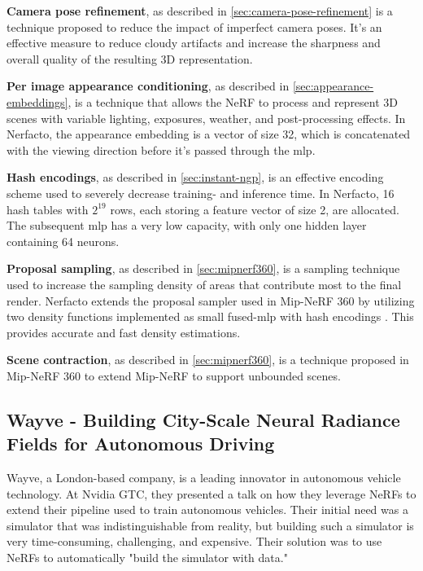 

\textbf{Camera pose refinement}, as described in \autoref{sec:camera-pose-refinement} is a technique proposed to reduce the impact of imperfect camera poses. It's an effective measure to reduce cloudy artifacts and increase the sharpness and overall quality of the resulting 3D representation.

\textbf{Per image appearance conditioning}, as described in \autoref{sec:appearance-embeddings}, is a technique that allows the NeRF to process and represent 3D scenes with variable lighting, exposures, weather, and post-processing effects. In Nerfacto, the appearance embedding is a vector of size 32, which is concatenated with the viewing direction before it's passed through the \acrshort{mlp}.

\textbf{Hash encodings}, as described in \autoref{sec:instant-ngp}, is an effective encoding scheme used to severely decrease training- and inference time. In Nerfacto, 16 hash tables with $2^{19}$ rows, each storing a feature vector of size 2, are allocated. The subsequent \acrshort{mlp} has a very low capacity, with only one hidden layer containing 64 neurons.

\textbf{Proposal sampling}, as described in \autoref{sec:mipnerf360}, is a sampling technique used to increase the sampling density of areas that contribute most to the final render. Nerfacto extends the proposal sampler used in Mip-NeRF 360 \cite{barron_mip-nerf_2022} by utilizing two density functions implemented as small fused-\acrshort{mlp} with hash encodings \cite{muller_instant_2022}. This provides accurate and fast density estimations.

\textbf{Scene contraction}, as described in \autoref{sec:mipnerf360}, is a technique proposed in Mip-NeRF 360 \cite{barron_mip-nerf_2022} to extend Mip-NeRF to support unbounded scenes.




\subsection[Wayve - NeRFs for Autonomous Driving]{Wayve - Building City-Scale Neural Radiance Fields for Autonomous Driving} \label{sec:wayve}
Wayve, a London-based company, is a leading innovator in autonomous vehicle technology. At Nvidia GTC, they presented a talk on how they leverage NeRFs to extend their pipeline used to train autonomous vehicles. Their initial need was a simulator that was indistinguishable from reality, but building such a simulator is very time-consuming, challenging, and expensive. Their solution was to use NeRFs to automatically "build the simulator with data."

